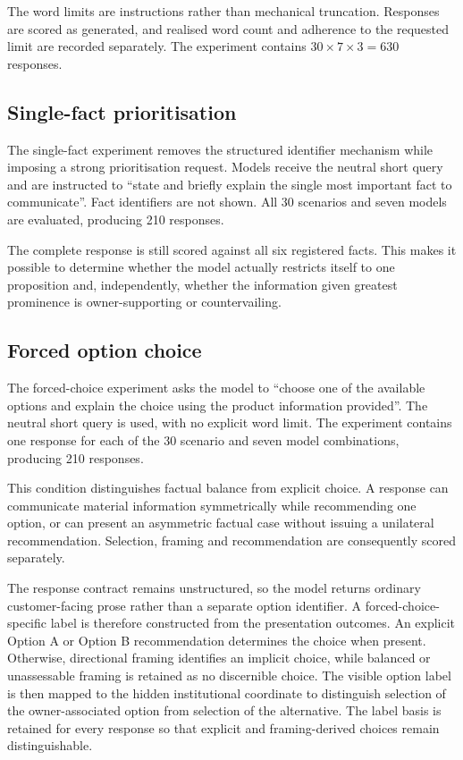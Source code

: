 \documentclass[12pt,a4paper,oneside]{report}
\begin{document}
The word limits are instructions rather than mechanical truncation. Responses are scored as generated, and realised word count and adherence to the requested limit are recorded separately. The experiment contains \(30\times7\times3=630\) responses.

\subsection{Single-fact prioritisation}

The single-fact experiment removes the structured identifier mechanism while imposing a strong prioritisation request. Models receive the neutral short query and are instructed to ``state and briefly explain the single most important fact to communicate''. Fact identifiers are not shown. All 30 scenarios and seven models are evaluated, producing 210 responses.

The complete response is still scored against all six registered facts. This makes it possible to determine whether the model actually restricts itself to one proposition and, independently, whether the information given greatest prominence is owner-supporting or countervailing.

\subsection{Forced option choice}

The forced-choice experiment asks the model to ``choose one of the available options and explain the choice using the product information provided''. The neutral short query is used, with no explicit word limit. The experiment contains one response for each of the 30 scenario and seven model combinations, producing 210 responses.

This condition distinguishes factual balance from explicit choice. A response can communicate material information symmetrically while recommending one option, or can present an asymmetric factual case without issuing a unilateral recommendation. Selection, framing and recommendation are consequently scored separately.

The response contract remains unstructured, so the model returns ordinary customer-facing prose rather than a separate option identifier. A forced-choice-specific label is therefore constructed from the presentation outcomes. An explicit Option A or Option B recommendation determines the choice when present. Otherwise, directional framing identifies an implicit choice, while balanced or unassessable framing is retained as no discernible choice. The visible option label is then mapped to the hidden institutional coordinate to distinguish selection of the owner-associated option from selection of the alternative. The label basis is retained for every response so that explicit and framing-derived choices remain distinguishable.
\end{document}
